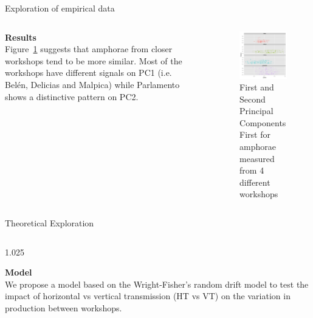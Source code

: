 \documentclass[final]{beamer}
\newlength{\sepwid}
\newlength{\onecolwid}
\newlength{\twocolwid}
\begin{document}
\begin{frame}[t]
\begin{columns}[t]
\begin{column}{\twocolwid}
\begin{block}{Exploration of empirical data}
\begin{columns}[t,totalwidth=\twocolwid]
\begin{column}{\onecolwid}
\vspace{1cm}
{\textbf{Results}}\\
\justify
Figure~\ref{fig:pca} suggests that amphorae from closer workshops tend to be more similar. Most of the workshops have different signals on PC1 (i.e. Bel\'en, Delicias and Malpica) while Parlamento shows a distinctive pattern on PC2.


\end{column}

\begin{column}{\sepwid}\end{column} %

\begin{column}{\onecolwid} %


\begin{figure}
\includegraphics[width=0.6\linewidth]{images/fig2.png}
\singlespace
\caption{First and Second Principal Components First for amphorae measured from 4 different workshops}
\label{fig:pca}
\end{figure}

\end{column}
\end{columns}

\end{block}

\begin{block}{Theoretical Exploration}

\begin{columns}[t,totalwidth=\twocolwid]

\begin{column}{1.025\onecolwid} %

{\textbf{Model }}\\
\justify
We propose a model based on the Wright-Fisher's random drift model to test the impact of horizontal vs vertical transmission (HT vs VT) on the variation in production between workshops.  %


\end{column}
\end{columns}
\end{block}
\end{column}
\end{columns}
\end{frame}
\end{document}
